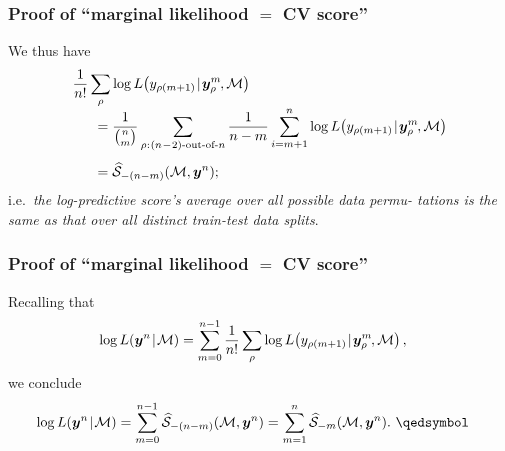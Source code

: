 \documentclass[18pt]{beamer}
\newcommand{\defineTightSpacing}{%
	\setlength{\abovedisplayskip}{.25\baselineskip}%
	\setlength{\belowdisplayskip}{.25\baselineskip}%
}
\newcommand{\given}{\thinnerspace | \thinnerspace}
\newcommand{\spacedColon}{\mkern .5mu : \mkern 1mu}
\newcommand{\thinnerspace}{\mskip.5\thinmuskip}
\newcommand{\negthinnerspace}{\mskip-.5\thinmuskip}
\newcommand{\likelihood}{L}
\newcommand{\by}{\bm{y}}
\newcommand{\score}{\mathcal{S}}
\newcommand{\modelSymbol}{\mathcal{M}}
\newcommand{\permutation}{\rho}
\newcommand{\trainingSize}{m}
\newcommand{\testSampleIndex}{i}
\begin{document}
\begin{frame}
\frametitle{Proof of ``marginal likelihood $=$ {\large CV} score''}
We thus have
\begin{equation*} %
\begin{aligned}
&\frac{1}{n!} \sum_\permutation \log \likelihood\!\left(y_{\permutation(\trainingSize + 1)} \given \by_\permutation^\trainingSize\negthinnerspace, \modelSymbol \right) \\[-.25\baselineskip]
&\hspace*{1.5em}= \frac{1}{{n \choose \trainingSize}} \sum_{\permutation \spacedColon \text{$(n\!-\!2)$-out-of-$n$}} 
	\frac{1}{n - \trainingSize} \sum_{\testSampleIndex = \trainingSize + 1}^n
		\log \likelihood\!\left(y_{\permutation(\trainingSize + 1)} \given \by_\permutation^\trainingSize\negthinnerspace, \modelSymbol \right) \\[.25\baselineskip]
&\hspace*{1.5em}= \widehat{\score}_{-(n - m)}(\modelSymbol, \by^n);
\end{aligned}
\end{equation*}
i.e.\ \textit{the log-predictive score's average over all possible data permu- tations is the same as that over all distinct train-test data splits}.
\end{frame}


\begin{frame}
\frametitle{Proof of ``marginal likelihood $=$ {\large CV} score''}
Recalling that
\begin{equation*} \defineTightSpacing%
\begin{aligned}
\log \likelihood(\by^n \given \modelSymbol)
	&= \sum_{m = 0}^{n - 1} \frac{1}{n!} \sum_\permutation  \log \likelihood\!\left(y_{\permutation(\trainingSize + 1)} \given \by_\permutation^\trainingSize\negthinnerspace, \modelSymbol \right),
\end{aligned}
\end{equation*}
we conclude
\begin{equation*} \defineTightSpacing%
\begin{aligned}
\log \likelihood(\by^n \given \modelSymbol)
	&= \sum_{m = 0}^{n - 1} \widehat{\score}_{-(n - m)}(\modelSymbol, \by^n)
	= \sum_{m = 1}^{n} \widehat{\score}_{-m}(\modelSymbol, \by^n). \ \qedsymbol
\end{aligned}
\end{equation*}
\end{frame}


\end{document}
